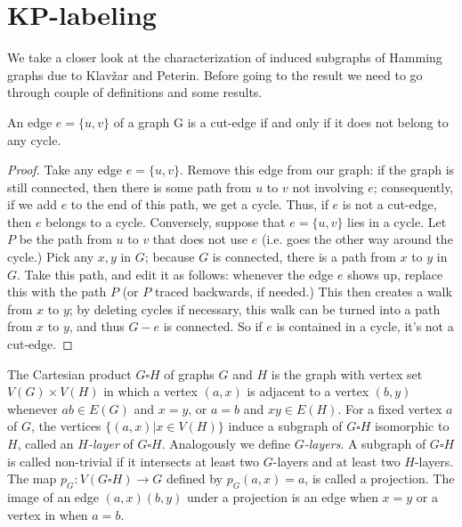 \documentclass[12pt,a4paper,titlepage,openany]{report}
\begin{document}
\section{KP-labeling}\label{kp-labeling-section}
We take a closer look at the characterization of induced subgraphs of Hamming graphs due to Klav\v zar and Peterin. \newline
Before going to the result we need to go through couple of definitions and some results.
\newline
\begin{lemma}\label{cutedgecycle}
An edge $e = \{u, v\}$ of a graph G is a cut-edge if and only if it does not belong to any cycle.
\end{lemma}
\begin{proof} Take any edge $e = \{u, v\}$. Remove this edge from our graph: if the graph is still connected, then there is some path from $u$ to $v$ not involving $e$;
consequently, if we add $e$ to the end of this path, we get a cycle. Thus, if $e$ is not a cut-edge, then $e$ belongs to a cycle.\newline
Conversely, suppose that $e = \{u, v\}$ lies in a cycle.
Let $P$ be the path from $u$ to $v$ that does not use $e$ (i.e. goes the other way around the cycle.) Pick any $x, y$ in $G$; because $G$ is connected, there is a path from $x$ to $y$ in $G$. Take this path, and edit it as follows:
whenever the edge $e$ shows up, replace this with the path $P$ (or $P$ traced backwards, if needed.) This then creates a walk from $x$ to $y$; by deleting cycles if necessary, this walk can be turned into a path from $x$ to $y$, and thus $G-e$ is connected. So if $e$ is contained in a cycle, it’s not a cut-edge.
\end{proof}
The Cartesian product $G\square H$ of graphs $G$ and $H$ is the graph with vertex set $V(G)\times V(H)$ in which a vertex $(a,x)$ is adjacent to a vertex $(b,y)$ whenever
$ab\in E(G)$ and $x=y$, or $a=b$ and $xy\in E(H)$. For a fixed vertex $a$ of $G$, the vertices $\{(a,x)|x\in V(H)\}$ induce a subgraph of $G \square H$ isomorphic to $H$, called an \textit{$H$-layer} of $G \square H$. Analogously we define \textit{$G$-layers}. A subgraph of $G \square H$ is called non-trivial if it intersects at least two $G$-layers and at least two $H$-layers. \newline
The map $p_G:V(G\square H) \to G$ defined by $p_G(a,x)=a$, is called a projection. The image of an edge $(a,x)(b,y)$ under a projection is an edge when $x=y$ or a vertex in when $a=b$.\newline
\end{document}
